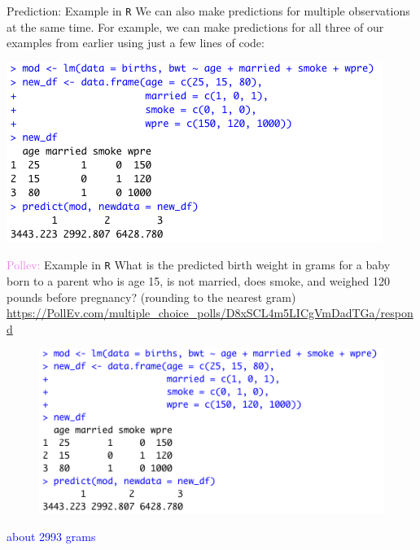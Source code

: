 \documentclass[10pt,t]{beamer}
\begin{document}
\begin{frame}{Prediction: Example in \texttt{R}}
We can also make predictions for multiple observations at the same time. For example, we can make predictions for all three of our examples from earlier using just a few lines of code:

\bigskip

\centering \includegraphics[scale=0.6]{figures/newdata_example2.png}

\end{frame}
\vspace{-10 mm}
\begin{frame}{\textcolor{violet}{Pollev:} Example in \texttt{R}}
	What is the predicted birth weight in grams for a baby born to a parent who is age 15, is not married, does smoke, and weighed 120 pounds before pregnancy? (rounding to the nearest gram)\\
	\tiny{\url{https://PollEv.com/multiple_choice_polls/D8xSCL4m5LICgVmDadTGa/respond}}
	
	\medskip
	
	\begin{figure}
	\centering \includegraphics[scale=0.6]{figures/newdata_example2.png}
\end{figure}\pause
\normalsize
 \textcolor{blue}{about 2993 grams}
	
\end{frame}
\end{document}
